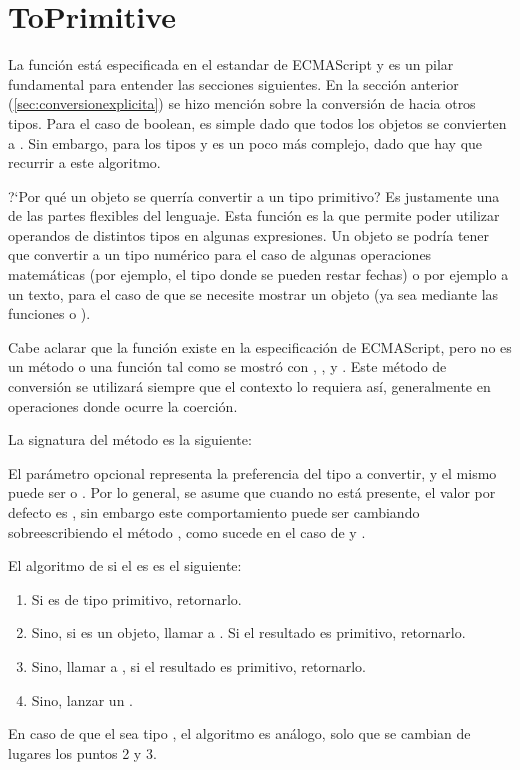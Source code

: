\section{ToPrimitive}
\label{sec:toprimitive}

La función  está especificada en el estandar de ECMAScript y es un pilar fundamental para entender las secciones siguientes. En la sección anterior (\ref{sec:conversionexplicita}) se hizo mención sobre la conversión de  hacia otros tipos. Para el caso de boolean, es simple dado que todos los objetos se convierten a . Sin embargo, para los tipos  y  es un poco más complejo, dado que hay que recurrir a este algoritmo. 

?`Por qué un objeto se querría convertir a un tipo primitivo? Es justamente una de las partes flexibles del lenguaje. Esta función es la que permite poder utilizar operandos de distintos tipos en algunas expresiones. Un objeto se podría tener que convertir a un tipo numérico para el caso de algunas operaciones matemáticas (por ejemplo, el tipo  donde se pueden restar fechas) o por ejemplo a un texto, para el caso de que se necesite mostrar un objeto (ya sea mediante las funciones  o ).

Cabe aclarar que la función  existe en la especificación de ECMAScript, pero no es un método o una función tal como se mostró con , ,  y . Este método de conversión se utilizará siempre que el contexto lo requiera así, generalmente en operaciones donde ocurre la coerción.

La signatura del método es la siguiente: 

El parámetro opcional  representa la preferencia del tipo a convertir, y el mismo puede ser  o . Por lo general, se asume que cuando no está presente, el valor por defecto es , sin embargo este comportamiento puede ser cambiando sobreescribiendo el método , como sucede en el caso de  y .

El algoritmo de  si el  es  es el siguiente:

\begin{enumerate}
\item Si  es de tipo primitivo, retornarlo.
\item Sino, si  es un objeto, llamar a . Si el resultado es primitivo, retornarlo.
\item Sino, llamar a , si el resultado es primitivo, retornarlo.
\item Sino, lanzar un .
\end{enumerate}

En caso de que el  sea tipo , el algoritmo es análogo, solo que se cambian de lugares los puntos 2 y 3.
